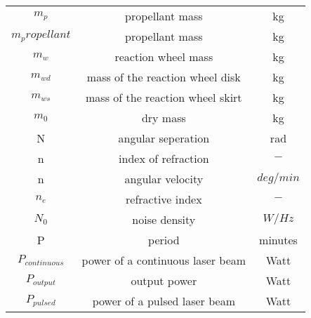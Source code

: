 \begin{center}
\begin{longtable}{c|c|c}
$m_p$								    						& propellant mass 																												& kg \\

$m_propellant$ 											& propellant mass 																												& kg \\

$m_w$                               & reaction wheel mass  																										& kg \\

$m_{wd}$                            & mass of the reaction wheel disk  																				& kg \\

$m_{ws}$                            & mass of the reaction wheel skirt 																				& kg \\

$m_0$                               & dry mass                         																				& kg \\

N 																	& angular seperation 																											& rad \\

n 																	& index of refraction																											& $-$ \\

n                                		& angular velocity                             														& $deg/{min}$ \\

$n_e$ 															& refractive index 																												& $-$ \\

$N_0$                           		& noise density                                														& $W/Hz$ \\

P                             			& period                                      														& minutes \\

$P_{continuous}$ 										& power of a continuous laser beam																				& Watt \\

$P_{output}$                       	& output power                             																& Watt \\

$P_{pulsed}$ 												& power of a pulsed laser beam																						& Watt \\


\end{longtable}
\end{center}
